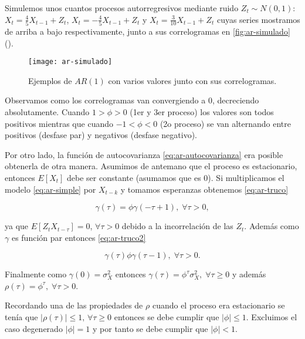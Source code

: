 Simulemos unos cuantos procesos autorregresivos mediante ruido $Z_t \sim N(0, 1)$: $X_t = \frac{4}{5}X_{t-1} + Z_t$, $X_t = -\frac{4}{5}X_{t-1} + Z_t$ y $X_t = \frac{3}{10}X_{t-1} + Z_t$ cuyas series mostramos de arriba a bajo respectivamente, junto a sus correlogramas en \autoref{fig:ar-simulado} (\cite{chatfield2019analysis}).

\begin{figure}[htpb]
  \centering
  \texttt{[image: ar-simulado]}
  \caption{Ejemplos de $AR(1)$ con varios valores junto con sus correlogramas.}
  \label{fig:ar-simulado}
\end{figure}

Observamos como los correlogramas van convergiendo a 0, decreciendo absolutamente. Cuando $1 > \phi > 0$ (1er y 3er proceso) los valores son todos positivos mientras que cuando $-1 < \phi < 0$ (2o proceso) se van alternando entre positivos (desfase par) y negativos (desfase negativo).

Por otro lado, la función de autocovarianza \eqref{eq:ar-autocovarianza} era posible obtenerla de otra manera. Asumimos de antemano que el proceso es estacionario, entonces $E[X_t]$ debe ser constante (asumamos que es 0). Si multiplicamos el modelo \eqref{eq:ar-simple} por $X_{t-k}$ y tomamos esperanzas obtenemos \eqref{eq:ar-truco}

\begin{equation}
  \gamma(\tau) = \phi \gamma(-\tau + 1), \; \forall \tau > 0,
  \label{eq:ar-truco}
\end{equation}

ya que $E[Z_t X_{t-\tau}] = 0$, $\forall \tau > 0$ debido a la incorrelación de las $Z_t$. Además como $\gamma$ es función par entonces \eqref{eq:ar-truco2}

\begin{equation}
  \gamma(\tau) \phi \gamma(\tau - 1), \; \forall \tau > 0.
  \label{eq:ar-truco2}
\end{equation}

Finalmente como $\gamma(0) = \sigma^2_X$ entonces $\gamma(\tau) = \phi^\tau \sigma^2_X, \; \forall \tau \geq 0$ y además $\rho(\tau) = \phi^\tau, \; \forall \tau > 0$.

Recordando una de las propiedades de $\rho$ cuando el proceso era estacionario se tenía que $|\rho(\tau)| \leq 1, \, \forall \tau \geq 0$ entonces se debe cumplir que $|\phi| \leq 1$. Excluimos el caso degenerado $|\phi| = 1$ y por tanto se debe cumplir que $|\phi| < 1$.

